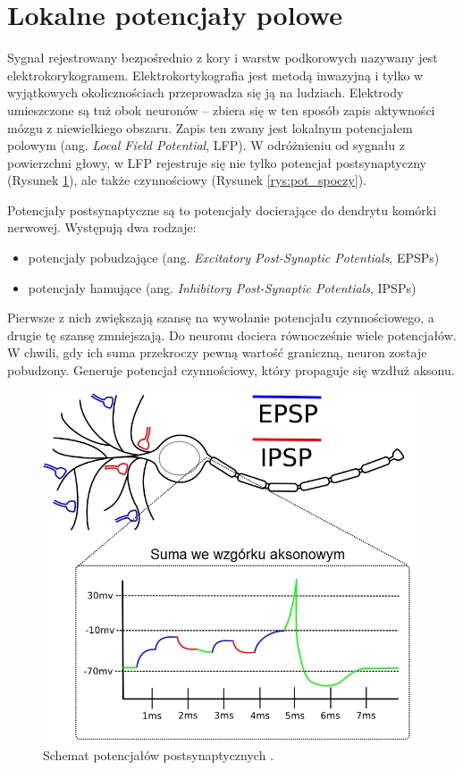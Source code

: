 \documentclass{pracamgr}
\begin{document}
	\section{Lokalne potencjały polowe}
	Sygnał rejestrowany bezpośrednio z kory i warstw podkorowych nazywany jest elektrokorykogramem. Elektrokortykografia jest metodą inwazyjną i tylko w  wyjątkowych okolicznościach przeprowadza się ją na ludziach. Elektrody umieszczone są tuż obok neuronów -- zbiera się w ten sposób zapis aktywności mózgu z niewielkiego obszaru. Zapis ten zwany jest lokalnym potencjałem polowym (ang. \textit{Local Field Potential}, LFP). W odróżnieniu od sygnału z powierzchni głowy, w LFP rejestruje się nie tylko potencjał postsynaptyczny (Rysunek \ref{rys:epsp}), ale także czynnościowy (Rysunek \ref{rys:pot_spoczy}).
	
	Potencjały postsynaptyczne są to potencjały docierające do dendrytu komórki nerwowej. Występują dwa rodzaje:
	\begin{itemize}
		\item potencjały pobudzające (ang. \textit{Excitatory Post-Synaptic Potentials}, EPSPs)
		\item potencjały hamujące (ang. \textit{Inhibitory Post-Synaptic Potentials}, IPSPs) 
	\end{itemize}
	Pierwsze z nich zwiększają szansę na wywołanie potencjału czynnościowego, a drugie tę szansę zmniejszają. Do neuronu dociera równocześnie wiele potencjałów. W chwili, gdy ich suma przekroczy pewną wartość graniczną, neuron zostaje pobudzony. Generuje potencjał czynnościowy, który propaguje się wzdłuż aksonu.
	\begin{figure}[htbp]
		\begin{center}
			\includegraphics[scale=0.5]{epsp.jpg}
		\end{center}
		\caption{Schemat potencjałów postsynaptycznych \citep{versace}.}
		\label{rys:epsp}
	\end{figure}
\end{document}
